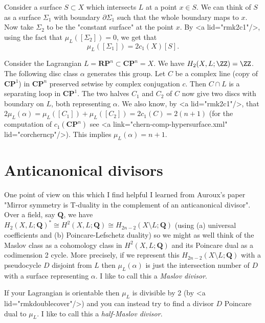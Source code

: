 \documentclass{article}
\begin{document}
\begin{Example}
  Consider a surface $S\subset X$ which intersects $L$ at a point $x\in S$. We can think of $S$ as a surface $\Sigma_1$ with boundary $\partial\Sigma_1$ such that the whole boundary maps to $x$. Now take $\Sigma_2$ to be the "constant surface" at the point $x$. By <a lid="rmk2c1"/>, using the fact that $\mu_L([\Sigma_2])=0$, we get that
  \[\mu_L([\Sigma_1])=2c_1(X)[S].\]
\end{Example}

\begin{Example}[exmrpn]
  Consider the Lagrangian $L=\mathbf{RP}^n\subset\mathbf{CP}^n=X$. We have $H_2(X,L;\ZZ)=\ZZ$. The following disc class $\alpha$ generates this group. Let $C$ be a complex line (copy of $\mathbf{CP}^1$) in $\mathbf{CP}^n$ preserved setwise by complex conjugation $c$. Then $C\cap L$ is a separating loop in $\mathbf{CP}^1$. The two halves $C_1$ and $C_2$ of $C$ now give two discs with boundary on $L$, both representing $\alpha$. We also know, by <a lid="rmk2c1"/>, that $2\mu_L(\alpha)=\mu_L([C_1])+\mu_L([C_2])=2c_1(C)=2(n+1)$ (for the computation of $c_1(\mathbf{CP}^n)$ see <a link="chern-comp-hypersurface.xml" lid="corcherncp"/>). This implies $\mu_L(\alpha)=n+1$.
\end{Example}

\section{Anticanonical divisors}

One point of view on this which I find helpful I learned from Auroux's paper "Mirror symmetry is T-duality in the complement of an anticanonical divisor". Over a field, say $\mathbf{Q}$, we have $H_2(X,L;\mathbf{Q})^*\cong H^2(X,L;\mathbf{Q})\cong H_{2n-2}(X\setminus L;\mathbf{Q})$ (using (a) universal coefficients and (b) Poincare-Lefschetz duality) so we might as well think of the Maslov class as a cohomology class in $H^2(X,L;\mathbf{Q})$ and its Poincare dual as a codimension 2 cycle. More precisely, if we represent this $H_{2n-2}(X\setminus L;\mathbf{Q})$ with a pseudocycle $D$ disjoint from $L$ then $\mu_L(\alpha)$ is just the intersection number of $D$ with a surface representing $\alpha$. I like to call this a {\em Maslov divisor}.

If your Lagrangian is orientable then $\mu_L$ is divisible by 2 (by <a lid="rmkdoublecover"/>) and you can instead try to find a divisor $D$ Poincare dual to $\mu_L$. I like to call this a {\em half-Maslov divisor}.
\end{document}
